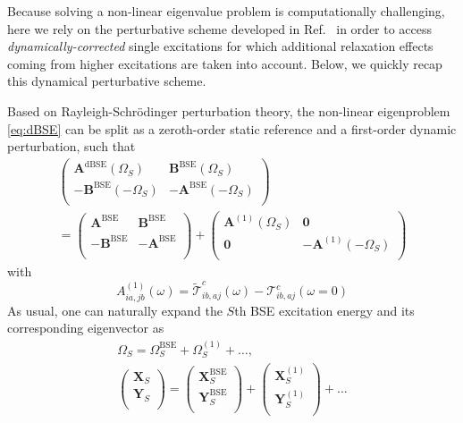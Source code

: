 \documentclass[aip,jcp,reprint,noshowkeys,superscriptaddress]{revtex4-1}
\newcommand{\BSE}{\text{BSE}}
\newcommand{\dBSE}{\text{dBSE}}
\newcommand{\Om}[2]{\Omega_{#1}^{#2}}
\newcommand{\bO}{\mathbf{0}}
\newcommand{\bA}[2]{\mathbf{A}_{#1}^{#2}}
\newcommand{\bB}[2]{\mathbf{B}_{#1}^{#2}}
\newcommand{\bX}[2]{\mathbf{X}_{#1}^{#2}}
\newcommand{\bY}[2]{\mathbf{Y}_{#1}^{#2}}
\newcommand{\cT}{\mathcal{T}}
\begin{document}
Because solving a non-linear eigenvalue problem is computationally challenging, here we rely on the perturbative scheme developed in Ref.~ in order to access \textit{dynamically-corrected} single excitations for which additional relaxation effects coming from higher excitations are taken into account.
\cite{Rohlfing_2000,Romaniello_2009b,Ma_2009a,Ma_2009b,Zhang_2013,Rebolini_2016,Olevano_2019,Loos_2020h,Authier_2020,Monino_2021}
Below, we quickly recap this dynamical perturbative scheme.

Based on Rayleigh-Schr\"odinger perturbation theory, the non-linear eigenproblem \eqref{eq:dBSE} can be split as a zeroth-order static reference and a first-order dynamic perturbation, such that
\begin{multline}
\label{eq:LR-PT}
	\begin{pmatrix}
		\bA{}{\dBSE}(\Om{S}{})		&	\bB{}{\BSE}(\Om{S}{})	\\
		-\bB{}{\BSE}(-\Om{S}{})	&	-\bA{}{\BSE}(-\Om{S}{})	\\
	\end{pmatrix}
	\\
	=
	\begin{pmatrix}
		\bA{}{\BSE}	&	\bB{}{\BSE}	
		\\
		-\bB{}{\BSE}	&	-\bA{}{\BSE}	
		\\
	\end{pmatrix}
	+
	\begin{pmatrix}
		\bA{}{(1)}(\Om{S}{})		&	\bO	\\
		\bO	&	-\bA{}{(1)}(-\Om{S}{})	\\
	\end{pmatrix}
\end{multline}
with
\begin{equation}
	\label{eq:BSE-A1}
	A_{ia,jb}^{(1)}(\omega) = \widetilde{\cT}^c_{ib,aj}(\omega) - \cT^c_{ib,aj}(\omega = 0)
\end{equation}
As usual, one can naturally expand the $S$th BSE excitation energy and its corresponding eigenvector as
\begin{subequations}
\begin{gather}
	\Om{S}{} = \Om{S}{\BSE} + \Om{S}{(1)} + \ldots,
	\\
	\begin{pmatrix}
		\bX{S}{}	\\
		\bY{S}{}	\\
	\end{pmatrix}
	= 
	\begin{pmatrix}
		\bX{S}{\BSE}	\\
		\bY{S}{\BSE}	\\
	\end{pmatrix}
	+
	\begin{pmatrix}
		\bX{S}{(1)}	\\
		\bY{S}{(1)}	\\
	\end{pmatrix}
	+ \ldots
\end{gather}
\end{subequations}
\end{document}
